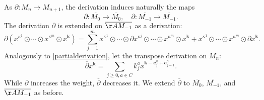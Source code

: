 \documentclass[a4paper,11pt]{article}
\newcommand{\modz}[1]{\textcolor{magenta}{#1}\index {#1}}
\begin{document}



As $\partial\colon M_n\rightarrow M_{n+1}$, the derivation induces naturally the maps
\[
\partial\colon \overline{M_0}\rightarrow \overline{M_0},\quad
\partial\colon \overline{M_{-1}}\rightarrow \overline{M_{-1}}.
\]
The derivation $\partial$ is extended on $\overline{\AA M_{-1}}$ as a derivation:
\[
\partial(x^{\kappa^1}\odot \cdots \odot x^{\kappa^m} \odot x^{\mathbf k})
=\sum_{j=1}^m x^{\kappa^1}\odot \cdots \odot  \partial x^{\kappa^j} \odot \cdots \odot x^{\kappa^m}\odot x^{\mathbf k}
+ x^{\kappa^1}\odot \cdots \odot x^{\kappa^m} \odot \partial x^{\mathbf k}.
\]
Analogously to \eqref{partialderivation}, let the transpose derivation on $M_n$:
\[
    \overline{\partial} x^{\mathbf k}=\sum_{j\geq 0, a\in C} k_j^a x^{\mathbf k - \mathbf e_j^a + \mathbf e_{j-1}^a}.
\]
While $\partial$ increases the weight, $\overline{\partial}$ decreases it.
We extend $\overline{\partial}$ to $\overline{M_0}$, $\overline{M_{-1}}$, and $\overline{\AA M_{-1}}$ as before.
\end{document}
